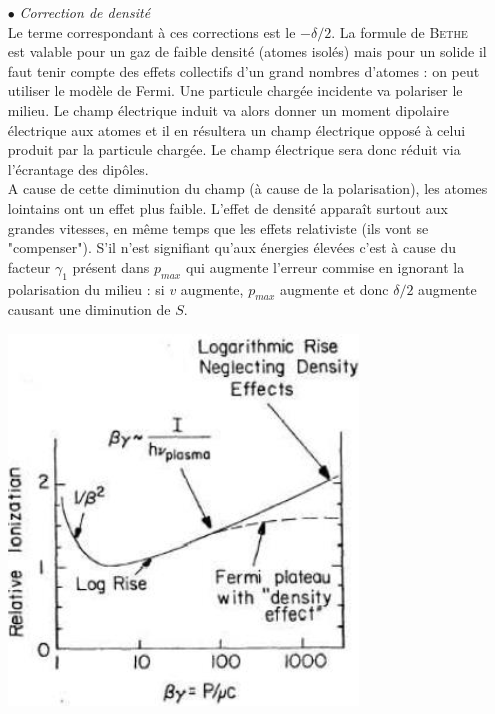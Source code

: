 \newpage

\begin{itemize}
\item[$\bullet$] \textit{Correction de densité}\ \\
Le terme correspondant à ces corrections est le $-\delta/2$. La formule de \textsc{Bethe} est 
valable pour un gaz de faible densité (atomes isolés) mais pour un solide il faut tenir compte
des effets collectifs d'un grand nombres d'atomes : on peut utiliser le modèle de Fermi. Une 
particule chargée incidente va polariser le milieu. Le champ électrique induit va alors donner un
moment dipolaire électrique aux atomes et il en résultera un champ électrique opposé à celui 
produit par la particule chargée. Le champ électrique sera donc réduit via l'écrantage des dipôles.\\

A cause de cette diminution du champ (à cause de la polarisation), les atomes lointains ont un 
effet plus faible. L'effet de densité apparaît surtout aux grandes vitesses, en même temps que les 
effets relativiste (ils vont se "compenser"). S'il n'est signifiant qu'aux énergies élevées c'est 
à cause du facteur $\gamma_1$ présent dans $p_{max}$ qui augmente l'erreur commise en ignorant la
polarisation du milieu : si $v$ augmente, $p_{max}$ augmente et donc $\delta/2$ augmente causant une
diminution de $S$.

\begin{center}
	\includegraphics[scale=0.5]{ch2/image3.png}
\end{center}


\end{itemize}
